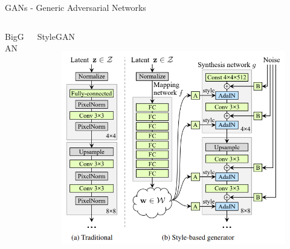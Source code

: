 \documentclass[t]{beamer}
\begin{document}
\begin{frame}[c]{GANs - Generic Adversarial Networks}
\begin{columns}[t]
  \begin{column}{0.5\linewidth}
  \begin{block}{BigGAN}
   
   \end{block}
  \end{column}
   \begin{column}{0.5\linewidth}
  \begin{block}{StyleGAN}
\begin{figure}[ht!]
    \centering
    \includegraphics[scale=0.2]{stylegan-scheme.PNG}
\end{figure} 
   \end{block}
  \end{column}
 \end{columns}
\end{frame}
\end{document}
